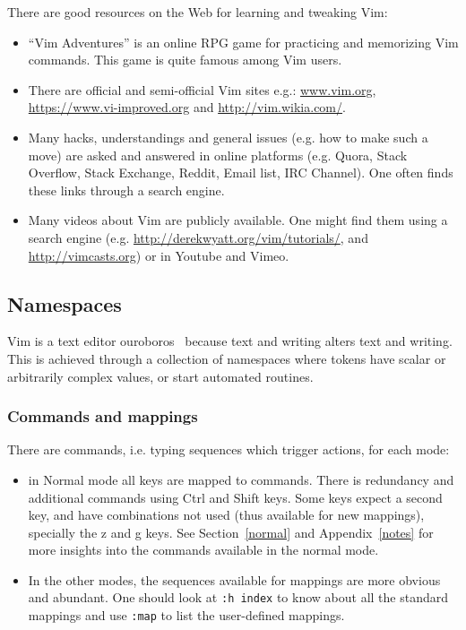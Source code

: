 \documentclass{article}
\newcommand{\tttt}[1]{\texttt{#1}}
\begin{document}
There are good resources on the Web for learning
and tweaking Vim:
\begin{itemize}
  \item ``Vim Adventures'' is an online RPG game for practicing
  and memorizing Vim commands. This game is quite famous among Vim users.
  \item There are official and semi-official Vim sites e.g.:
  \url{www.vim.org}, \url{https://www.vi-improved.org} and
  \url{http://vim.wikia.com/}.
  \item Many hacks, understandings and general issues
  (e.g. how to make such a move) are asked and answered
  in online platforms (e.g. Quora, Stack Overflow, Stack Exchange, Reddit, Email list, IRC Channel).
  One often finds these links through a search engine.
  \item Many videos about Vim are publicly available.
  One might find them using a search engine
  (e.g. \url{http://derekwyatt.org/vim/tutorials/}, and
  \url{http://vimcasts.org}) or in Youtube and Vimeo.
\end{itemize}

\subsection{Namespaces}\label{namespaces}
Vim is a text editor ouroboros~\cite{ouroWiki} because
text and writing alters text and writing.
This is achieved through a collection of namespaces where tokens have scalar
or arbitrarily complex values, or start automated routines.

\subsubsection{Commands and mappings}
There are commands, i.e. typing sequences which trigger actions,
for each mode:
\begin{itemize}
	\item in Normal mode all keys are mapped to commands.
		There is redundancy and additional commands
		using Ctrl and Shift keys.
		Some keys expect a second key,
    and have combinations not used (thus available for new mappings),
		specially the z and g keys.
    See Section~\ref{normal} and Appendix~\ref{notes}
    for more insights into the commands available in the
    normal mode.
	\item In the other modes, the sequences available for mappings are more obvious and abundant.
		One should look at \tttt{:h index} to know about all the standard mappings
		and use \tttt{:map} to list the user-defined mappings.
\end{itemize}
\end{document}
